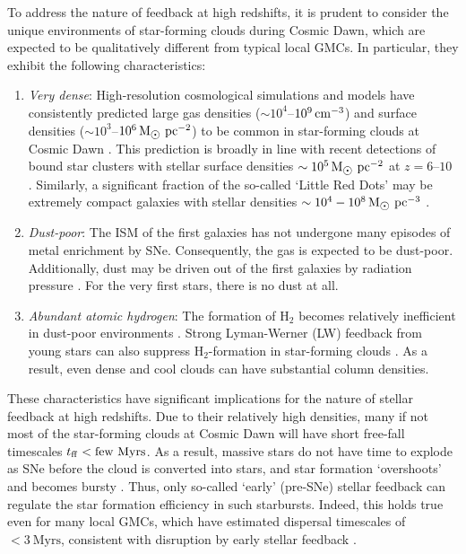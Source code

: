 \documentclass[fleqn,usenatbib]{mnras}
\newcommand\Msun{\text{M}_{\astrosun}} %
\newcommand\HI{\ion{H}{I}\xspace} %
\begin{document}
To address the nature of feedback at high redshifts, it is prudent to consider the unique environments of star-forming clouds during Cosmic Dawn, which are expected to be qualitatively different from typical local GMCs. In particular, they exhibit the following characteristics:
\begin{enumerate}
    \item \textit{Very dense}: High-resolution cosmological simulations and models have consistently predicted large gas densities ($\sim 10^4$--$10^9\,\rm cm^{-3}$) and surface densities ($\sim 10^3$--$10^6\,\Msun ~ \rm pc^{-2}$) to be common in star-forming clouds at Cosmic Dawn \citep[e.g.][]{Oh2002, Safranek2014, Kimm2016_GC, Ricotti2016, Latif2022, Nebrin2022, Garcia2023}. This prediction is broadly in line with recent detections of bound star clusters with stellar surface densities $\sim 10^5\,\Msun ~ \rm pc^{-2}$ at $z = 6$--$10$ \citep{Vanzella2023, Adamo2024}. Similarly, a significant fraction of the so-called `Little Red Dots' may be extremely compact galaxies with stellar densities $\sim 10^4 - 10^8\,\Msun ~ \rm pc^{-3}$ \citep{Audric2024}.
    \item \textit{Dust-poor}: The ISM of the first galaxies has not undergone many episodes of metal enrichment by SNe. Consequently, the gas is expected to be dust-poor. Additionally, dust may be driven out of the first galaxies by radiation pressure \citep{Fukushima2018, Hirashita2019_radiationpressuredust}. For the very first stars, there is no dust at all. 
    \item \textit{Abundant atomic hydrogen}: The formation of H$_2$ becomes relatively inefficient in dust-poor environments \citep[e.g.][]{Cazaux2009, Nebrin2023cooling, Sternberg2021}. Strong Lyman-Werner (LW) feedback from young stars can also suppress H$_2$-formation in star-forming clouds \citep{Sugimura2024}. As a result, even dense and cool clouds can have substantial \HI column densities. 
\end{enumerate}
These characteristics have significant implications for the nature of stellar feedback at high redshifts. Due to their relatively high densities, many if not most of the star-forming clouds at Cosmic Dawn will have short free-fall timescales $t_{\rm ff} < \textrm{few Myrs}$. As a result, massive stars do not have time to explode as SNe before the cloud is converted into stars, and star formation `overshoots' and becomes bursty \citep[e.g.][]{Kimm2016_GC, Faucher2018_bursty, Nebrin2022}. Thus, only so-called `early' (pre-SNe) stellar feedback can regulate the star formation efficiency in such starbursts. Indeed, this holds true even for many local GMCs, which have estimated dispersal timescales of $< 3 ~ \textrm{Myrs}$, consistent with disruption by early stellar feedback \citep{Kruijssen2019, Chevance2022, Chevance2023}. 
\end{document}
